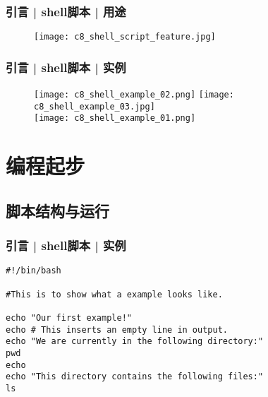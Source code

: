 \begin{frame}
  \frametitle{引言 | shell脚本 | 用途}
  \begin{figure}
    \centering
    \texttt{[image: c8\_shell\_script\_feature.jpg]}
  \end{figure}
\end{frame}

\begin{frame}
  \frametitle{引言 | shell脚本 | 实例}
  \begin{figure}
    \centering
    \texttt{[image: c8\_shell\_example\_02.png]}\quad
    \texttt{[image: c8\_shell\_example\_03.jpg]}\\
    \vspace{0.5cm}
    \texttt{[image: c8\_shell\_example\_01.png]}
  \end{figure}
\end{frame}

\section{编程起步}
\subsection{脚本结构与运行}
\begin{frame}[fragile]
  \frametitle{引言 | shell脚本 | 实例}
\begin{lstlisting}
#!/bin/bash

#This is to show what a example looks like.

echo "Our first example!"
echo # This inserts an empty line in output.
echo "We are currently in the following directory:"
pwd
echo
echo "This directory contains the following files:"
ls
\end{lstlisting}
\end{frame}

